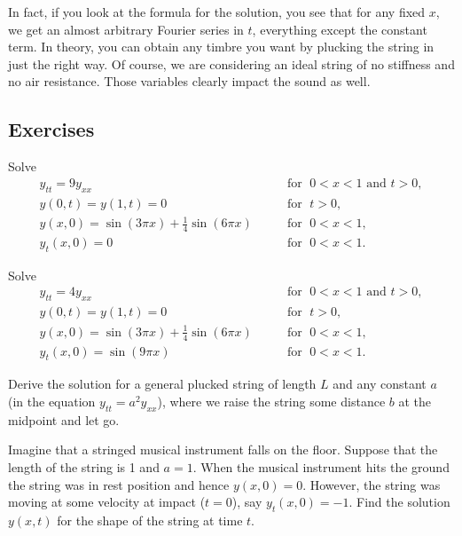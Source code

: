 In fact, if you look at the formula for the solution, you see that for any
fixed $x$, we get an almost arbitrary Fourier series in $t$, everything
except the constant term.  In theory, you can obtain any timbre you want
by plucking the string in just the right way.
Of course, we are considering an ideal string of no stiffness and no air
resistance.  Those variables clearly impact the sound as well.

\subsection{Exercises}

\begin{exercise}
Solve
\begin{equation*}
\begin{array}{ll}
y_{tt} = 9 y_{xx}  & \qquad \text{for } \; 0 < x < 1 \text{ and } t > 0,  \\
y(0,t) = y(1,t) = 0 & \qquad \text{for } \; t > 0 ,  \\
y(x,0) = \sin (3\pi x) + \frac{1}{4} \sin (6 \pi x) & \qquad \text{for } \; 0 < x < 1 , \\
y_t(x,0) = 0 & \qquad \text{for } \; 0 < x < 1 .
\end{array}
\end{equation*}
\end{exercise}

\begin{exercise}
Solve
\begin{equation*}
\begin{array}{ll}
y_{tt} = 4 y_{xx} & \qquad \text{for } \; 0 < x < 1 \text{ and } t > 0, \\
y(0,t) = y(1,t) = 0 & \qquad \text{for } \; t > 0,  \\
y(x,0) = \sin (3\pi x) + \frac{1}{4} \sin (6 \pi x) & \qquad \text{for } \; 0 < x < 1 , \\
y_t(x,0) = \sin (9 \pi x) & \qquad \text{for } \; 0 < x < 1 .
\end{array}
\end{equation*}
\end{exercise}

\begin{exercise}
Derive the solution for a general plucked string of length $L$ and
any constant $a$ (in the equation $y_{tt} = a^2 y_{xx}$), where we
raise the string some distance $b$ at the midpoint and let go.
\end{exercise}

\begin{samepage}
\begin{exercise}
Imagine that a stringed musical instrument falls on the floor.  Suppose that
the length of the string is 1 and $a=1$.  When the musical instrument hits
the ground the string was in rest position and hence $y(x,0) = 0$.  However,
the string was moving at some velocity at impact ($t=0$),
say $y_t(x,0) = -1$.  Find the
solution
$y(x,t)$ for the shape of the string at time $t$.
\end{exercise}
\end{samepage}

